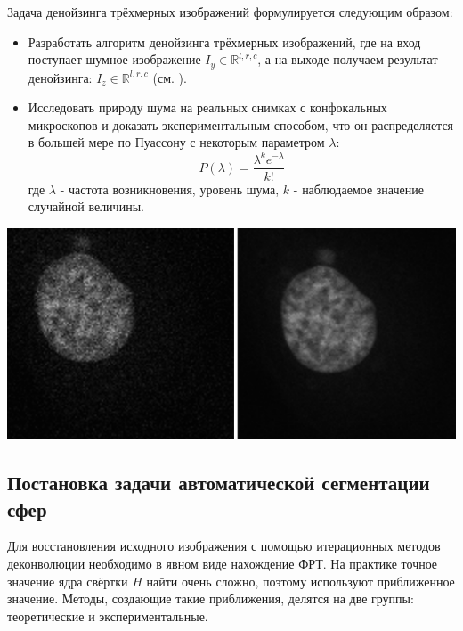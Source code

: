 \par Задача денойзинга трёхмерных изображений формулируется следующим образом:
\begin{itemize}[]
	\item Разработать алгоритм денойзинга трёхмерных изображений, где на вход поступает шумное изображение $I_y \in \mathbb{R}^{l,r,c}$, а на выходе получаем результат денойзинга: $I_z \in \mathbb{R}^{l,r,c}$ (см. ).
	\item Исследовать природу шума на реальных снимках с конфокальных микроскопов и доказать экспериментальным способом, что он распределяется в большей мере по Пуассону с некоторым параметром $\lambda$:
	\begin{equation}
		P(\lambda) = \frac{\lambda^k e^{-\lambda}}{k!}
	\end{equation}
	где $\lambda$ - частота возникновения, уровень шума, $k$ - наблюдаемое значение случайной величины.
	
\end{itemize}
\begin{minipage}{\textwidth}
	\centering
	\vspace{\mfloatsep} %
	\includegraphics[keepaspectratio=true,scale=0.45] {my_folder/images/problem/denoisiong_example.png}
	\label{fig:denoise-problem} 
	\vspace{\mfloatsep} %
\end{minipage}

\subsection{Постановка задачи автоматической сегментации сфер}
\par Для восстановления исходного изображения с помощью итерационных методов деконволюции необходимо в явном виде нахождение ФРТ. На практике точное значение ядра свёртки $H$ найти очень сложно, поэтому используют приближенное значение. Методы, создающие такие приближения, делятся на две группы: теоретические и экспериментальные.

